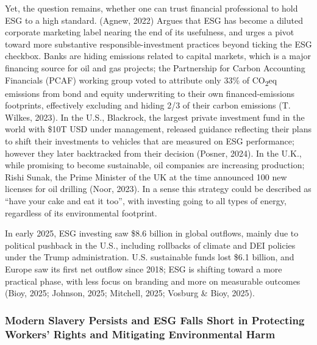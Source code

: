 \documentclass[
  12pt,
  letterpaper,
  DIV=11,
  numbers=noendperiod]{scrartcl}
\begin{document}
Yet, the question remains, whether one can trust financial professional
to hold ESG to a high standard. (Agnew, 2022) Argues that ESG has become
a diluted corporate marketing label nearing the end of its usefulness,
and urges a pivot toward more substantive responsible-investment
practices beyond ticking the ESG checkbox. Banks are hiding emissions
related to capital markets, which is a major financing source for oil
and gas projects; the Partnership for Carbon Accounting Financials
(PCAF) working group voted to attribute only 33\% of
CO\textsubscript{2}eq emissions from bond and equity underwriting to
their own financed-emissions footprints, effectively excluding and
hiding 2/3 of their carbon emissions (T. Wilkes, 2023). In the U.S.,
Blackrock, the largest private investment fund in the world with \$10T
USD under management, released guidance reflecting their plans to shift
their investments to vehicles that are measured on ESG performance;
however they later backtracked from their decision (Posner, 2024). In
the U.K., while promising to become sustainable, oil companies are
increasing production; Rishi Sunak, the Prime Minister of the UK at the
time announced 100 new licenses for oil drilling (Noor, 2023). In a
sense this strategy could be described as ``have your cake and eat it
too'', with investing going to all types of energy, regardless of its
environmental footprint.

In early 2025, ESG investing saw \$8.6 billion in global outflows,
mainly due to political pushback in the U.S., including rollbacks of
climate and DEI policies under the Trump administration. U.S.
sustainable funds lost \$6.1 billion, and Europe saw its first net
outflow since 2018; ESG is shifting toward a more practical phase, with
less focus on branding and more on measurable outcomes (Bioy, 2025;
Johnson, 2025; Mitchell, 2025; Vosburg \& Bioy, 2025).

\subsubsection{Modern Slavery Persists and ESG Falls Short in Protecting
Workers' Rights and Mitigating Environmental
Harm}\label{modern-slavery-persists-and-esg-falls-short-in-protecting-workers-rights-and-mitigating-environmental-harm}
\end{document}
